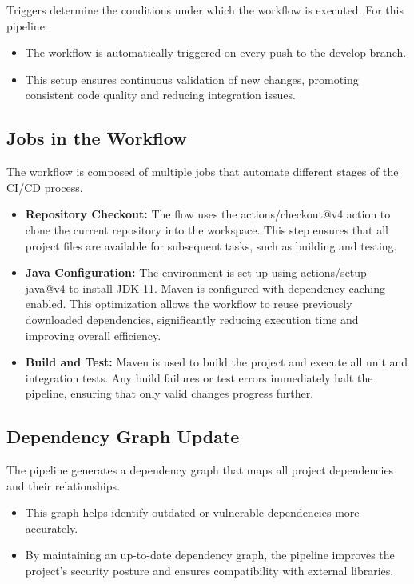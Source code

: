 \documentclass[a4paper]{article}
\begin{document}
Triggers determine the conditions under which the workflow is executed. For this pipeline:
\begin{itemize}
    \item The workflow is automatically triggered on every push to the develop branch.
    \item This setup ensures continuous validation of new changes, promoting consistent code quality and reducing integration issues.
\end{itemize}

\subsection{Jobs in the Workflow}

The workflow is composed of multiple jobs that automate different stages of the CI/CD process.

\begin{itemize}
    \item \textbf{Repository Checkout:} The flow uses the actions/checkout@v4 action to clone the current repository into the workspace. This step ensures that all project files are available for subsequent tasks, such as building and testing.
    \item \textbf{Java Configuration:} The environment is set up using actions/setup-java@v4 to install JDK 11. Maven is configured with dependency caching enabled. This optimization allows the workflow to reuse previously downloaded dependencies, significantly reducing execution time and improving overall efficiency.

    \item \textbf{Build and Test:} Maven is used to build the project and execute all unit and integration tests. Any build failures or test errors immediately halt the pipeline, ensuring that only valid changes progress further.
\end{itemize}

\subsection{Dependency Graph Update}

The pipeline generates a dependency graph that maps all project dependencies and their relationships.
\begin{itemize}
    \item This graph helps identify outdated or vulnerable dependencies more accurately.
    \item By maintaining an up-to-date dependency graph, the pipeline improves the project's security posture and ensures compatibility with external libraries.
\end{itemize}
    
\end{document}
